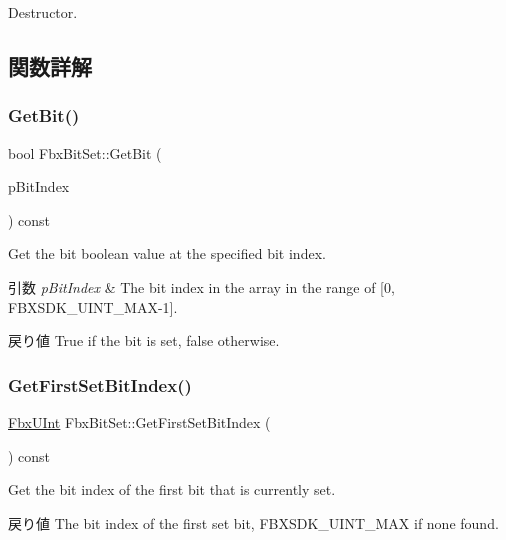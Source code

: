 Destructor. 



\subsection{関数詳解}
\mbox{\label{class_fbx_bit_set_a79b538f2c893476457eac2b11d1d7e28}} 
\subsubsection{\texorpdfstring{Get\+Bit()}{GetBit()}}
{\footnotesize\ttfamily bool Fbx\+Bit\+Set\+::\+Get\+Bit (\begin{DoxyParamCaption}\item[{const \hyperlink{fbxtypes_8h_ae9fb141d8158a730aa85ec5ff2ea3f6b}{Fbx\+U\+Int}}]{p\+Bit\+Index }\end{DoxyParamCaption}) const}

Get the bit boolean value at the specified bit index. 
\begin{DoxyParams}{引数}
{\em p\+Bit\+Index} & The bit index in the array in the range of \mbox{[}0, F\+B\+X\+S\+D\+K\+\_\+\+U\+I\+N\+T\+\_\+\+M\+A\+X-\/1\mbox{]}. \\
\hline
\end{DoxyParams}
\begin{DoxyReturn}{戻り値}
True if the bit is set, false otherwise. 
\end{DoxyReturn}
\mbox{\label{class_fbx_bit_set_ac7747c0ffab8b6d63d931e52548a0f2a}} 
\subsubsection{\texorpdfstring{Get\+First\+Set\+Bit\+Index()}{GetFirstSetBitIndex()}}
{\footnotesize\ttfamily \hyperlink{fbxtypes_8h_ae9fb141d8158a730aa85ec5ff2ea3f6b}{Fbx\+U\+Int} Fbx\+Bit\+Set\+::\+Get\+First\+Set\+Bit\+Index (\begin{DoxyParamCaption}{ }\end{DoxyParamCaption}) const}

Get the bit index of the first bit that is currently set. \begin{DoxyReturn}{戻り値}
The bit index of the first set bit, F\+B\+X\+S\+D\+K\+\_\+\+U\+I\+N\+T\+\_\+\+M\+AX if none found. 
\end{DoxyReturn}
\mbox{\label{class_fbx_bit_set_af7459511dca956e445c733e1b1b43ef9}} 

